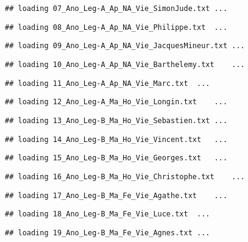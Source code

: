 \documentclass[]{article}
\begin{document}
\begin{verbatim}
## loading 07_Ano_Leg-A_Ap_NA_Vie_SimonJude.txt ...
\end{verbatim}

\begin{verbatim}
## loading 08_Ano_Leg-A_Ap_NA_Vie_Philippe.txt  ...
\end{verbatim}

\begin{verbatim}
## loading 09_Ano_Leg-A_Ap_NA_Vie_JacquesMineur.txt ...
\end{verbatim}

\begin{verbatim}
## loading 10_Ano_Leg-A_Ap_NA_Vie_Barthelemy.txt    ...
\end{verbatim}

\begin{verbatim}
## loading 11_Ano_Leg-A_Ap_NA_Vie_Marc.txt  ...
\end{verbatim}

\begin{verbatim}
## loading 12_Ano_Leg-A_Ma_Ho_Vie_Longin.txt    ...
\end{verbatim}

\begin{verbatim}
## loading 13_Ano_Leg-B_Ma_Ho_Vie_Sebastien.txt ...
\end{verbatim}

\begin{verbatim}
## loading 14_Ano_Leg-B_Ma_Ho_Vie_Vincent.txt   ...
\end{verbatim}

\begin{verbatim}
## loading 15_Ano_Leg-B_Ma_Ho_Vie_Georges.txt   ...
\end{verbatim}

\begin{verbatim}
## loading 16_Ano_Leg-B_Ma_Ho_Vie_Christophe.txt    ...
\end{verbatim}

\begin{verbatim}
## loading 17_Ano_Leg-B_Ma_Fe_Vie_Agathe.txt    ...
\end{verbatim}

\begin{verbatim}
## loading 18_Ano_Leg-B_Ma_Fe_Vie_Luce.txt  ...
\end{verbatim}

\begin{verbatim}
## loading 19_Ano_Leg-B_Ma_Fe_Vie_Agnes.txt ...
\end{verbatim}
\end{document}
